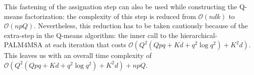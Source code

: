 This fastening of the assignation step can also be used while constructing the Q-means factorization: the complexity of this step is reduced from $\mathcal{O}(ndk)$ to $\mathcal{O}(npQ)$. Nevertheless, this reduction has to be taken cautiously because of the extra-step in the Q-means algorithm: the inner call to the hierarchical-PALM4MSA at each iteration that costs $\mathcal{O}(Q^2(Qpq + Kd + q^2\log q^2) + K^2d)$. This leaves us with an overall time complexity of $\mathcal{O}(Q^2(Qpq + Kd + q^2\log q^2) + K^2d) + npQ$. 




